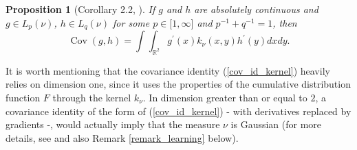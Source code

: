 \documentclass[11pt]{article}
\newtheorem{proposition}[theorem]{Proposition}
\DeclareMathOperator{\cov}{Cov}
\begin{document}
\begin{proposition}[Corollary 2.2, \protect\cite{saumwellner2017efron}]
\label{theorem_cov_id_kernel} If $g$ and $h$ are absolutely continuous and $%
g\in L_{p}(\nu )$, $h\in L_{q}(\nu )$ for some $p\in \lbrack 1,\infty ]$ and 
$p^{-1}+q^{-1}=1$, then 
\begin{equation}
\cov(g,h)=\int \!\!\!\int_{\mathbb{R}^{2}}g^{\prime }(x)k_{\nu
}(x,y)h^{\prime }(y)dxdy\text{.}  \label{cov_id_kernel}
\end{equation}
\end{proposition}

It is worth mentioning that the covariance identity (\ref{cov_id_kernel})
heavily relies on dimension one, since it uses the properties of the
cumulative distribution function $F$ through the kernel $k_{\nu }$. In
dimension greater than or equal to $2$, a covariance identity of the form of
(\ref{cov_id_kernel}) - with derivatives replaced by gradients -, would
actually imply that the measure $\nu $ is Gaussian (for more details, see 
\cite{MR1836739} and also Remark \ref{remark_learning} below).
\end{document}
